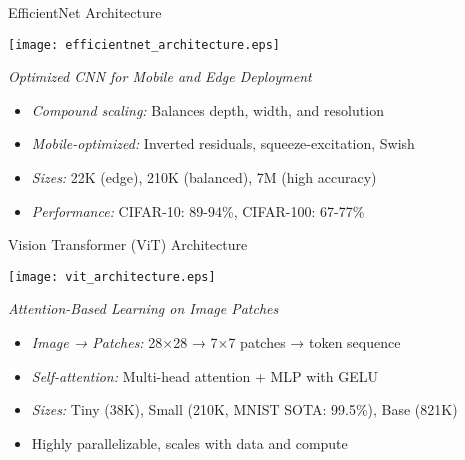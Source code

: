 \begin{slide}[\slideopts,toc={EfficientNet}]{EfficientNet Architecture}
  
  \centerline{\texttt{[image: efficientnet\_architecture.eps]}}

  \emph{Optimized CNN for Mobile and Edge Deployment}
  
  \begin{itemize}
    \item \emph{Compound scaling:} Balances depth, width, and resolution
    
    \item \emph{Mobile-optimized:} Inverted residuals, squeeze-excitation, Swish
    
    \item \emph{Sizes:} 22K (edge), 210K (balanced), 7M (high accuracy)
    
    \item \emph{Performance:} CIFAR-10: 89-94\%, CIFAR-100: 67-77\%
  \end{itemize}
  
\end{slide}

\begin{slide}[\slideopts,toc={ViT}]{Vision Transformer (ViT) Architecture}
  
  \centerline{\texttt{[image: vit\_architecture.eps]}}

  \emph{Attention-Based Learning on Image Patches}
  
  \begin{itemize}
    \item \emph{Image → Patches:} 28×28 → 7×7 patches → token sequence
    
    \item \emph{Self-attention:} Multi-head attention + MLP with GELU
    
    \item \emph{Sizes:} Tiny (38K), Small (210K, MNIST SOTA: 99.5\%), Base (821K)
    
    \item Highly parallelizable, scales with data and compute
  \end{itemize}
  
\end{slide}
